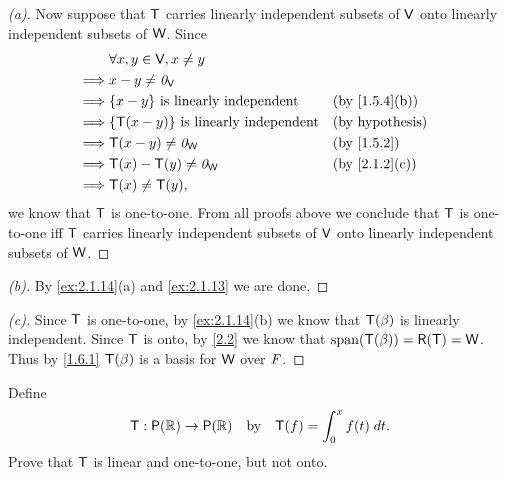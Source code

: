 \begin{proof}[(a)]
  Now suppose that \(\mathsf{T}\) carries linearly independent subsets of \(\mathsf{V}\) onto linearly independent subsets of \(\mathsf{W}\).
  Since
  \begin{align*}
             & \forall x, y \in \V, x \neq y                                               \\
    \implies & x - y \neq \zv_{\V}                                                         \\
    \implies & \set{x - y} \text{ is linearly independent}     &  & \by{1.5.4}[b]          \\
    \implies & \set{\T(x - y)} \text{ is linearly independent} &  & \text{(by hypothesis)} \\
    \implies & \T(x - y) \neq \zv_{\W}                         &  & \by{1.5.2}             \\
    \implies & \T(x) - \T(y) \neq \zv_{\W}                     &  & \by{2.1.2}[c]          \\
    \implies & \T(x) \neq \T(y),
  \end{align*}
  we know that \(\mathsf{T}\) is one-to-one.
  From all proofs above we conclude that \(\mathsf{T}\) is one-to-one iff \(\mathsf{T}\) carries linearly independent subsets of \(\mathsf{V}\) onto linearly independent subsets of \(\mathsf{W}\).
\end{proof}

\begin{proof}[(b)]
  By \cref{ex:2.1.14}(a) and \cref{ex:2.1.13} we are done.
\end{proof}

\begin{proof}[(c)]
  Since \(\mathsf{T}\) is one-to-one, by \cref{ex:2.1.14}(b) we know that \(\mathsf{T}(\beta)\) is linearly independent.
  Since \(\mathsf{T}\) is onto, by \cref{2.2} we know that \(\spn{\T(\beta)} = \rg{\T} = \W\).
  Thus by \cref{1.6.1} \(\mathsf{T}(\beta)\) is a basis for \(\mathsf{W}\) over \(\mathit{F}\).
\end{proof}

\begin{ex}\label{ex:2.1.15}
  Define
  \[
    \T : \ps{\R} \to \ps{\R} \quad \text{by} \quad \T(f) = \int_0^x f(t) \; dt.
  \]
  Prove that \(\mathsf{T}\) is linear and one-to-one, but not onto.
\end{ex}

